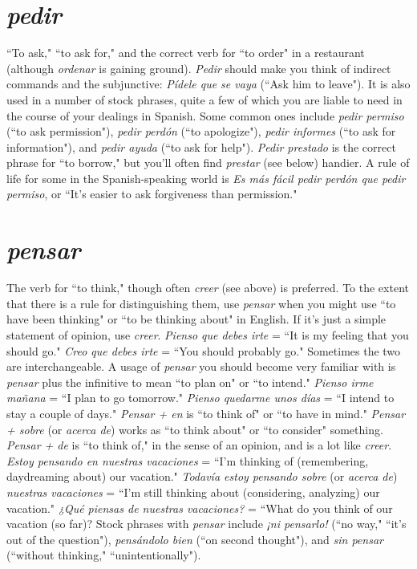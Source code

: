 \section{\emph{pedir}}

``To ask," ``to ask for," and the correct verb for ``to order" in
a restaurant (although \emph{ordenar} is gaining ground). \emph{Pedir} should make
you think of indirect commands and the subjunctive: \emph{Pídele que se
vaya} (``Ask him to leave"). It is also used in a number of stock phrases,
quite a few of which you are liable to need in the course of your dealings in Spanish. Some common ones include \emph{pedir permiso} (``to ask
permission"), \emph{pedir perdón} (``to apologize"), \emph{pedir informes} (``to ask for
information"), and \emph{pedir ayuda} (``to ask for help"). \emph{Pedir prestado} is
the correct phrase for ``to borrow," but you'll often find \emph{prestar} (see below) handier. A rule of life for some in the Spanish-speaking world is
\emph{Es más fácil pedir perdón que pedir permiso}, or ``It's easier to ask forgiveness than permission."

\section{\emph{pensar}}

The verb for ``to think," though often \emph{creer} (see above) is preferred. To the extent that there is a rule for distinguishing them, use
\emph{pensar} when you might use ``to have been thinking" or ``to be thinking
about" in English. If it's just a simple statement of opinion, use \emph{creer}.
\emph{Pienso que debes irte} = ``It is my feeling that you should go." \emph{Creo
que debes irte} = ``You should probably go." Sometimes the two are
interchangeable. A usage of \emph{pensar} you should become very familiar
with is \emph{pensar} plus the infinitive to mean ``to plan on" or ``to intend."
\emph{Pienso irme mañana} = ``I plan to go tomorrow." \emph{Pienso quedarme
unos días} = ``I intend to stay a couple of days." \emph{Pensar + en} is ``to
think of" or ``to have in mind." \emph{Pensar + sobre} (or \emph{acerca de}) works as
``to think about" or ``to consider" something. \emph{Pensar + de} is ``to think
of," in the sense of an opinion, and is a lot like \emph{creer}. \emph{Estoy pensando en nuestras vacaciones}
= ``I'm thinking of (remembering, daydreaming about) our vacation." \emph{Todavía estoy pensando sobre} (or \emph{acerca de})
\emph{nuestras vacaciones} = ``I'm still thinking about (considering, analyzing) our vacation." \emph{¿Qué piensas de nuestras vacaciones?} = ``What do
you think of our vacation (so far)? Stock phrases with \emph{pensar} include
\emph{¡ni pensarlo!} (``no way," ``it's out of the question"), \emph{pensándolo bien}
(``on second thought"), and \emph{sin pensar} (``without thinking,"
``unintentionally").

